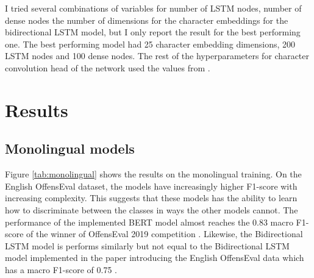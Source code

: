 \documentclass[nofilelist]{cslthse-msc}
\begin{document}
I tried several combinations of variables for number of LSTM nodes, number of dense nodes the number of dimensions for the character embeddings for the bidirectional LSTM model, but I only report the result for the best performing one. The best performing model had 25 character embedding dimensions, 200 LSTM nodes and 100 dense nodes. The rest of the hyperparameters for character convolution head of the network used the values from \citet{DBLP:journals/corr/ChiuN15}.

\chapter{Results}

\section{Monolingual models}

Figure \ref{tab:monolingual} shows the results on the monolingual training. On the English OffensEval dataset, the models have increasingly higher F1-score with increasing complexity. This suggests that these models has the ability to learn how to discriminate between the classes in ways the other models cannot. The performance of the implemented BERT model almost reaches the 0.83 macro F1-score of the winner of OffensEval 2019 competition \citep{zampieri2019semeval}. Likewise, the Bidirectional LSTM model is performs similarly but not equal to the Bidirectional LSTM model implemented in the paper introducing the English OffensEval data which has a macro F1-score of 0.75 \citep{zampierietal2019}.
\end{document}

